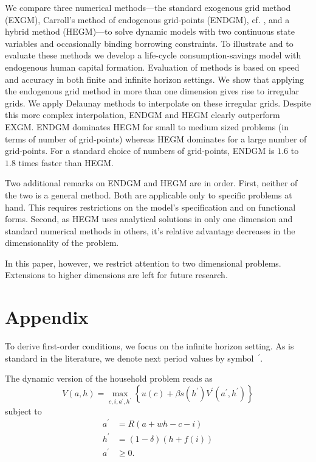 \documentclass[a4paper,12pt]{article}%
\begin{document}
We compare three numerical methods---the standard exogenous grid method
(EXGM), Carroll's method of endogenous grid-points (ENDGM), cf.
%
, and a hybrid method (HEGM)---to solve dynamic models with two continuous
state variables and occasionally binding borrowing constraints. To illustrate
and to evaluate these methods we develop a life-cycle consumption-savings
model with endogenous human capital formation. Evaluation of methods is based
on speed and accuracy in both finite and infinite horizon settings. We show
that applying the endogenous grid method in more than one dimension gives rise
to irregular grids. We apply Delaunay methods to interpolate on these
irregular grids. Despite this more complex interpolation, ENDGM and HEGM
clearly outperform EXGM. ENDGM dominates HEGM for small to medium sized
problems (in terms of number of grid-points) whereas HEGM dominates for a
large number of grid-points. For a standard choice of numbers of grid-points,
ENDGM is $1.6$ to~$1.8$ times faster than HEGM.

Two additional remarks on ENDGM and HEGM are in order. First, neither of the
two is a general method. Both are applicable only to specific problems at
hand. This requires restrictions on the model's specification and on
functional forms. Second, as HEGM uses analytical solutions in only one
dimension and standard numerical methods in others, it's relative advantage
decreases in the dimensionality of the problem.

In this paper, however, we restrict attention to two dimensional problems.
Extensions to higher dimensions are left for future research.

\clearpage\newpage

\section{Appendix}

\label{app:equations}

To derive first-order conditions, we focus on the infinite horizon setting. As
is standard in the literature, we denote next period values by
symbol~$^{\prime}$.

The dynamic version of the household problem reads as
\[
V(a,h)=\underset{c,i,a^{\prime},h^{\prime}}{\max}\left\{  u(c)+\beta s\left(
h^{\prime}\right)  V^{\prime}(a^{\prime},h^{\prime})\right\}
\]
subject to
\begin{align*}
a^{\prime}  &  =R\left(  a+wh-c-i\right) \\
h^{\prime}  &  =\left(  1-\delta\right)  \left(  h+f\left(  i\right)  \right)
\\
a^{\prime}  &  \geq0.
\end{align*}
\end{document}
